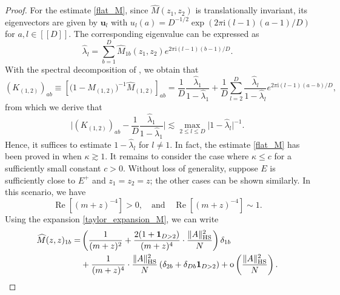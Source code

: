 \documentclass[10pt,reqno]{amsart}
\numberwithin{equation}{section}
\numberwithin{figure}{section}
\theoremstyle{plain} %
\theoremstyle{definition} %
\newcommand{\wh}{\widehat}
\renewcommand{\txt}[1]{\text{\rm{#1}}}
\newcommand{\ii}{\mathrm{i}}
\renewcommand{\leq}{\le}
\newcommand{\qq}[1]{[\![{#1}]\!]}
\newcommand{\pa}[1]{\left({#1}\right)}
\newcommand{\be}{\begin{equation}}
\newcommand{\ee}{\end{equation}}
\newcommand{\oo}{\mathrm{o}}
\newcommand{\HS}{\txt{HS}}
\numberwithin{equation}{section}
\begin{document}
\begin{proof}
For the estimate \eqref{flat_M}, since $\widehat{M}\pa{z_1,z_2}$ is translationally invariant, its eigenvectors are given by $\mathbf{u}_l$ with $u_l(a)=D^{-1 / 2} \exp (2 \pi \ii (l-1)(a-1) / D)$ for $a,l\in\qq D$. The corresponding eigenvalue can be expressed as
     \begin{equation}\label{eq_lambdak}
     \wh \lambda_l=\sum_{b=1}^D \widehat{M}_{1 b}\left(z_1, z_2\right) e^{2 \pi \ii (l-1)(b-1) / D}.
     \end{equation}
With the spectral decomposition of \smash{$\wh M_{(1,2)}$}, we obtain that
     \begin{equation}\nonumber
         \left(K_{(1,2)}\right)_{a b}\equiv  \left[\big(1-\wh M_{(1,2)}\big)^{-1}\wh M_{(1,2)} \right]_{ab} =\frac{1}{D}\frac{\widehat{\lambda}_1}{1-\widehat{\lambda}_1}+\frac{1}{D} \sum_{l=2}^D \frac{\widehat{\lambda}_l}{1-\widehat{\lambda}_l} e^{2 \pi \ii (l-1)(a-b) / D},
    \end{equation}
    from which we derive that
    \begin{equation}\nonumber
        \bigg|\left(K_{(1,2)}\right)_{a b}-\frac{1}{D}\frac{\widehat{\lambda}_1}{1-\widehat{\lambda}_1}\bigg| \lesssim \max _{2 \leq l \leq D}\big|1-\widehat{\lambda}_l\big|^{-1}.
    \end{equation}
    Hence, it suffices to estimate $1-\wh \lambda_l$ for $l\neq 1$. In fact, the estimate \eqref{flat_M} has been proved in \cite[Lemma A.1]{stone2024randommatrixmodelquantum} when $\kappa\gtrsim 1$. It remains to consider the case where $\kappa\le c$ for a sufficiently small constant $c>0$. Without loss of generality, suppose $E$ is sufficiently close to $E^+$ and $z_1=z_2=z$; the other cases can be shown similarly. In this scenario, we have 
    \be\label{eq:rem+z}
    \operatorname{Re}[(m+z)^{-4}]>0,\quad \text{and}\quad \operatorname{Re}[(m+z)^{-4}] \sim 1. 
    \ee
 Using the expansion \eqref{taylor_expansion_M}, we can write 
    \begin{equation}\label{wh_M_expansion}
        \begin{aligned}
            \widehat{M}(z, z)_{1 b}= & \left(\frac{1}{(m+z)^2}+\frac{2(1+\mathbf 1_{D>2})}{(m+z)^4} \cdot \frac{\|A\|_{\HS}^2}{N}\right) \delta_{1 b} \\
            &+\frac{1}{(m+z)^{4}}\cdot \frac{\|A\|_{\HS}^2} {N}\left(\delta_{2 b}+  \delta_{D b}\mathbf 1_{D>2}\right)+\oo\left(\frac{\|A\|_{\HS}^2} {N}\right).
        \end{aligned}
    \end{equation}

\end{proof}
\end{document}
